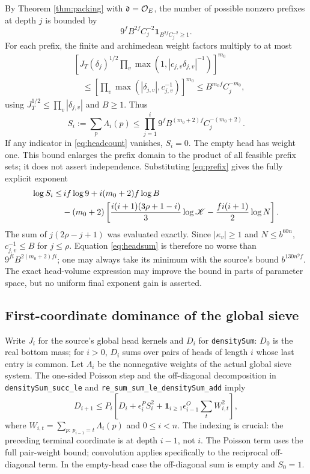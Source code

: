 \documentclass[11pt,a4paper]{article}
\begin{document}
By Theorem \ref{thm:packing} with $\mathfrak d=\mathcal O_E$, the number of possible nonzero prefixes at depth $j$ is bounded by
\begin{equation}\label{eq:headcount}
9^f B^{2f}C_j^{-2}\mathbf1_{B^{2f}C_j^{-2}\geq1}.
\end{equation}
For each prefix, the finite and archimedean weight factors multiply to at most
\begin{align*}
&\left[J_T(\delta_j)^{1/2}\prod_v\max(1,|c_{j,v}\delta_{j,v}|^{-1})\right]^{m_0}\\
&\quad\leq \left[\prod_v\max(|\delta_{j,v}|,c_{j,v}^{-1})\right]^{m_0}\leq B^{m_0f}C_j^{-m_0},
\end{align*}
using $J_T^{1/2}\leq\prod_v|\delta_{j,v}|$ and $B\geq1$. Thus
\begin{equation}\label{eq:headsum}
S_i:=\sum_p\Lambda_i(p)\leq\prod_{j=1}^i9^f B^{(m_0+2)f}C_j^{-(m_0+2)}.
\end{equation}
If any indicator in \eqref{eq:headcount} vanishes, $S_i=0$. The empty head has weight one. This bound enlarges the prefix domain to the product of all feasible prefix sets; it does not assert independence. Substituting \eqref{eq:prefix} gives the fully explicit exponent
\begin{align}
\log S_i\leq &\,if\log9+i(m_0+2)f\log B\\
&-(m_0+2)\left[\frac{i(i+1)(3\rho+1-i)}3\log\mathscr K-\frac{fi(i+1)}2\log N\right].\label{eq:headlog}
\end{align}
The sum of $j(2\rho-j+1)$ was evaluated exactly. Since $|\kappa_v|\geq1$ and $N\leq b^{60n}$, $c_{j,v}^{-1}\leq B$ for $j\leq\rho$. Equation \eqref{eq:headsum} is therefore no worse than $9^{fi}B^{2(m_0+2)fi}$; one may always take its minimum with the source's bound $b^{130n^9f}$. The exact head-volume expression may improve the bound in parts of parameter space, but no uniform final exponent gain is asserted.

\subsection{First-coordinate dominance of the global sieve}
Write $J_i$ for the source's global head kernels and $D_i$ for \texttt{densitySum}: $D_0$ is the real bottom mass; for $i>0$, $D_i$ sums over pairs of heads of length $i$ whose last entry is common. Let $\Lambda_i$ be the nonnegative weights of the actual global sieve system. The one-sided Poisson step and the off-diagonal decomposition in \texttt{densitySum\_\allowbreak succ\_\allowbreak le} and \texttt{re\_\allowbreak sum\_\allowbreak sum\_\allowbreak le\_\allowbreak densitySum\_\allowbreak add} imply
\begin{equation}\label{eq:recurrence}
D_{i+1}\leq P_i\left[D_i+\epsilon_i^P S_i^2+\mathbf1_{i\geq1}\epsilon_{i-1}^O\sum_t W_{i,t}^2\right],
\end{equation}
where $W_{i,t}=\sum_{p:\,p_{i-1}=t}\Lambda_i(p)$ and $0\leq i<n$. The indexing is crucial: the preceding terminal coordinate is at depth $i-1$, not $i$. The Poisson term uses the full pair-weight bound; convolution applies specifically to the reciprocal off-diagonal term. In the empty-head case the off-diagonal sum is empty and $S_0=1$.
\end{document}
